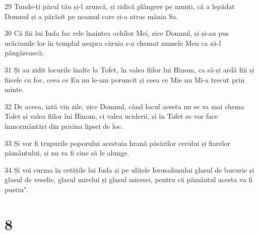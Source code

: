 \par 29 Tunde-ți părul tău și-l aruncă, și ridică plângere pe munți, că a lepădat Domnul și a părăsit pe neamul care și-a atras mânia Sa.
\par 30 Că fiii lui Iuda fac rele înaintea ochilor Mei, zice Domnul, și și-au pus urâciunile lor în templul asupra căruia s-a chemat numele Meu ca să-l pângărească;
\par 31 Și au zidit locurile înalte la Tofet, în valea fiilor lui Hinom, ca să-și ardă fiii și fiicele cu foc, ceea ce Eu nu le-am poruncit și ceea ce Mie nu Mi-a trecut prin minte.
\par 32 De aceea, iată vin zile, zice Domnul, când locul acesta nu se va mai chema Tofet și valea fiilor lui Hinom, ci valea uciderii, și în Tofet se vor face înmormântări din pricina lipsei de loc.
\par 33 Și vor fi trupurile poporului acestuia hrană păsărilor cerului și fiarelor pământului, și nu va fi cine să le alunge.
\par 34 Și voi curma în cetățile lui Iuda și pe ulițele Ierusalimului glasul de bucurie și glasul de veselie, glasul mirelui și glasul miresei, pentru că pământul acesta va fi pustiu".

\chapter{8}

